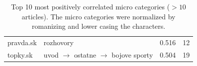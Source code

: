 \documentclass[11pt,a4paper]{article}
\begin{document}
\begin{table}[H]
\begin{tabular}{@{}lp{9cm}rr@{}}
		pravda.sk       & rozhovory                                                                                                                                                                       & 0.516                & 12             \\
		topky.sk        & uvod $\rightarrow$ ostatne $\rightarrow$ bojove sporty                                                                                                                          & 0.504                & 19             \\ \bottomrule
	\end{tabular}
	\caption{Top 10 most positively correlated micro categories ($> 10$ articles). The micro categories were normalized by romanizing and lower casing the characters.}
	\label{tab:core_10_micro}
\end{table}

\vspace{1em}
\end{document}
